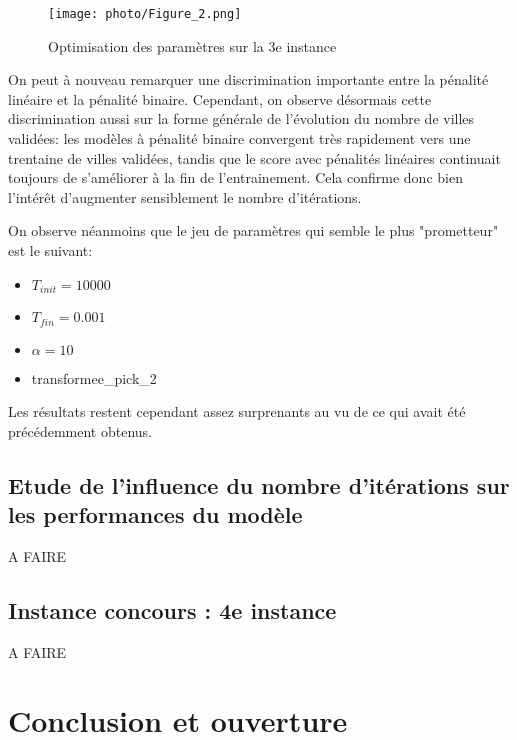 \documentclass[a4paper, 12pt]{article}
\begin{document}
\begin{figure}[!h]
    \centering
    \texttt{[image: photo/Figure\_2.png]}
    \caption{Optimisation des paramètres sur la 3e instance}
    \label{fig:parametres_3}
\end{figure}

On peut à nouveau remarquer une discrimination importante entre la pénalité linéaire et la pénalité binaire. Cependant, on observe désormais cette discrimination aussi sur la forme générale de l'évolution du nombre de villes validées:
les modèles à pénalité binaire convergent très rapidement vers une trentaine de villes validées, tandis que le score avec pénalités linéaires continuait toujours de s'améliorer à la fin de l'entrainement.
Cela confirme donc bien l'intérêt d'augmenter sensiblement le nombre d'itérations.


On observe néanmoins que le jeu de paramètres qui semble le plus "prometteur" est le suivant:
\begin{itemize}
    \item $T_{init} = 10000$
    \item $T_{fin} = 0.001$
    \item $\alpha = 10$
    \item transformee\_pick\_2
\end{itemize}

Les résultats restent cependant assez surprenants au vu de ce qui avait été précédemment obtenus.


\subsection{Etude de l'influence du nombre d'itérations sur les performances du modèle}
A FAIRE

\subsection{Instance concours : 4e instance}
A FAIRE


\section{Conclusion et ouverture}
\end{document}
